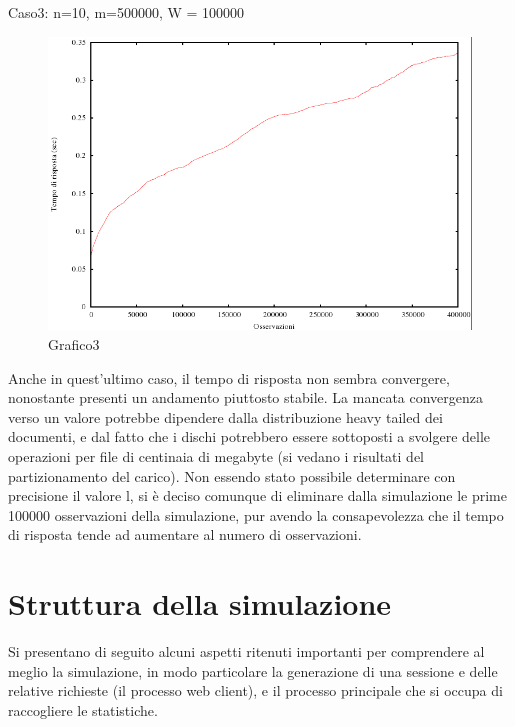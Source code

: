 Caso3: n=10, m=500000, W = 100000
\begin{figure}[H]
\begin{center}
\includegraphics[scale=0.5]{etc/grafico3.png}
\caption{Grafico3}
\label{Grafico3}
\end{center}
\end{figure}
Anche in quest'ultimo caso, il tempo di risposta non sembra convergere, nonostante presenti un andamento piuttosto stabile. La mancata convergenza verso un valore potrebbe dipendere dalla distribuzione heavy tailed dei documenti, e dal fatto che i dischi potrebbero essere sottoposti a svolgere delle operazioni per file di centinaia di megabyte (si vedano i risultati del partizionamento del carico). Non essendo stato possibile determinare con precisione il valore l, si è deciso comunque  di eliminare dalla simulazione le prime 100000 osservazioni della simulazione, pur avendo la consapevolezza che il tempo di risposta tende ad aumentare al numero di osservazioni.

\section{Struttura della simulazione}
Si presentano di seguito alcuni aspetti ritenuti importanti per comprendere al meglio la simulazione, in modo particolare la generazione di una sessione e delle relative richieste (il processo web client), e il processo principale che si occupa di raccogliere le statistiche.
